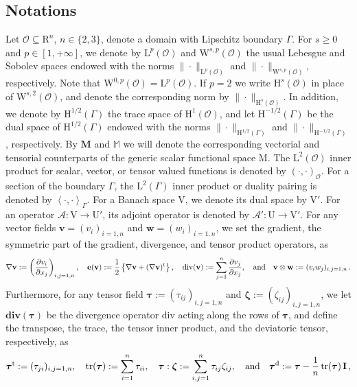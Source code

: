 \documentclass[11pt]{article}
\numberwithin{equation}{section}
\newcommand{\btau}{{\boldsymbol\tau}}
\newcommand{\bzeta}{{\boldsymbol\zeta}}
\newcommand{\bv}{{\mathbf{v}}}
\newcommand{\bw}{{\mathbf{w}}}
\newcommand{\be}{{\mathbf{e}}}
\newcommand{\0}{{\mathbf{0}}}
\def\bI{\mathbf{I}}
\def\bM{\mathbf{M}}
\newcommand\bbM{\mathbb{M}}
\newcommand{\cA}{\mathcal{A}}
\newcommand{\cO}{\mathcal{O}}
\def\R{\mathrm{R}}
\def\H{\mathrm{H}}
\def\L{\mathrm{L}}
\def\M{\mathrm{M}}
\def\U{\mathrm{U}}
\def\V{\mathrm{V}}
\def\W{\mathrm{W}}
\def\rd{\mathrm{d}}
\def\rt{\mathrm{t}}
\def\bdiv{\mathbf{div}}
\def\tr{\mathrm{tr}}
\def\div{\mathrm{div}}
\def\pil{\left<}
\def\pir{\right>}
\def\qan{{\quad\hbox{and}\quad}}
\numberwithin{equation}{section}
\begin{document}

\subsection*{Notations}

Let $\cO\subseteq \R^n$, $n\in \{2,3\}$, denote a domain with Lipschitz boundary $\Gamma$.
For $s\geq 0$ and $p\in [1,+\infty]$, we denote by $\L^p(\cO)$ and $\W^{s,p}(\cO)$ the usual Lebesgue and Sobolev spaces endowed with the norms $\|\cdot\|_{\L^p(\cO)}$ and $\|\cdot\|_{\W^{s,p}(\cO)}$, respectively.
Note that $\W^{0,p}(\cO) = \L^p(\cO)$.
If $p=2$ we write $\H^s(\cO)$ in place of $\W^{s,2}(\cO)$, and denote the corresponding norm by $\|\cdot\|_{\H^s(\cO)}$.
In addition, we denote by $\H^{1/2}(\Gamma)$ the trace space of $\H^1(\cO)$, and let $\H^{-1/2}(\Gamma)$ be the dual space of $\H^{1/2}(\Gamma)$ endowed with the norms $\|\cdot\|_{\H^{1/2}(\Gamma)}$ and $\|\cdot\|_{\H^{-1/2}(\Gamma)}$, respectively.
By $\bM$ and $\bbM$ we will denote the corresponding vectorial and tensorial counterparts of the generic scalar functional space $\M$.
The $\L^2(\cO)$ inner product for scalar, vector, or tensor valued functions is denoted by $(\cdot,\cdot)_{\cO}$. For a section of the boundary $\Gamma$, the $\L^2(\Gamma)$ inner product or duality pairing is denoted by $\pil\cdot,\cdot\pir_\Gamma$. For a Banach space $\V$, we denote its dual space by $\V'$. 
For an operator $\cA:\V \to \U'$, its adjoint operator is denoted by $\cA':\U \to \V'$. 
For any vector fields $\bv=(v_i)_{i=1,n}$ and $\bw=(w_i)_{i=1,n}$, 
we set the gradient, the symmetric part of the gradient, divergence,
and tensor product operators, as
\begin{equation*}
\nabla\bv := \left(\frac{\partial v_i}{\partial x_j}\right)_{i,j=1,n},\quad 
\be(\bv) := \frac{1}{2}\left\{ \nabla\bv + (\nabla\bv)^\rt \right\},\quad
\div(\bv) := \sum_{j=1}^n \frac{\partial v_j}{\partial x_j},\qan 
\bv\otimes\bw := (v_i w_j)_{i,j=1,n} \,.
\end{equation*}
Furthermore, for any tensor field $\btau:=(\tau_{ij})_{i,j=1,n}$ and $\bzeta:=(\zeta_{ij})_{i,j=1,n}$, we let $\bdiv(\btau)$ be the divergence operator $\div$ acting along the rows of $\btau$, and define the transpose,
the trace, the tensor inner product, and the deviatoric tensor, respectively, as
\begin{equation}\label{eq:transpose-trace-tensor-deviatoric}
\btau^\rt := (\tau_{ji})_{i,j=1,n},\quad \tr(\btau):=\sum_{i=1}^n \tau_{ii},\quad \btau:\bzeta:=\sum_{i,j=1}^n \tau_{ij}\zeta_{ij},\qan \btau^\rd:=\btau-\frac{1}{n}\,\tr(\btau)\,\bI\,,
\end{equation}
\end{document}
